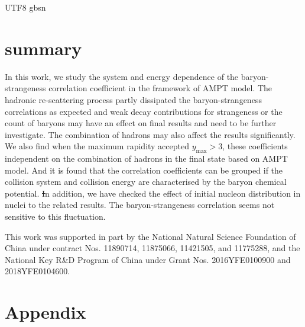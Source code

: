 \documentclass[twocolumn,showpacs,preprintnumbers,superscriptaddress,amsmath,amssymb]{revtex4}
\begin{document}
\begin{CJK*} {UTF8} {gbsn}
	
\section{summary}
\label{sec:summary}	


In this work, we study the system and energy dependence of the baryon-strangeness correlation coefficient in the framework of AMPT model. 
The hadronic re-scattering process partly dissipated the baryon-strangeness correlations as expected and weak decay contributions for strangeness or the count of baryons may have an effect on final results and need to be further investigate.
The combination of hadrons may also affect the results significantly. We also find when the maximum rapidity accepted $y_{\text{max}}>3$, these coefficients independent on the combination of hadrons in the final state based on AMPT model. And it is found that the correlation coefficients can be grouped if the collision system and collision energy are characterised by the baryon chemical potential.
{\sout In addition, we have checked the effect of initial nucleon distribution in nuclei to the related results. The baryon-strangeness correlation seems not sensitive to this fluctuation.}


		\begin{acknowledgements}
	
This work was supported in part by the National Natural Science Foundation of China under contract Nos. 11890714, 11875066, 11421505, and 11775288, and the National Key R\&D Program of China under Grant Nos. 2016YFE0100900 and 2018YFE0104600.

	\end{acknowledgements}
	
	
	
	\section{Appendix}
		  \begin{appendices} 

\end{appendices}
\end{CJK*}
\end{document}
